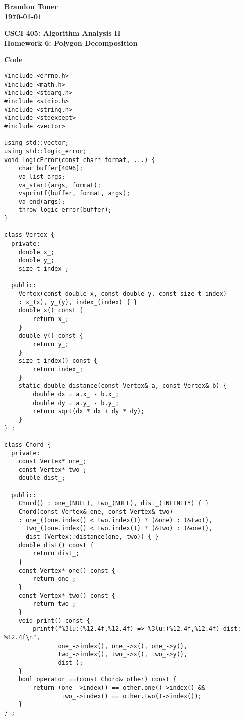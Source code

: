 \documentclass{article}%
\begin{document}
\begin{flushright}
\textbf{Brandon Toner \\
\today}
\end{flushright}

\begin{center}
\textbf{CSCI 405: Algorithm Analysis II \\
Homework 6: Polygon Decomposition} \\
\end{center}

\textbf{Code}
\begin{verbatim}
#include <errno.h>
#include <math.h>
#include <stdarg.h>
#include <stdio.h>
#include <string.h>
#include <stdexcept>
#include <vector>

using std::vector;
using std::logic_error;
void LogicError(const char* format, ...) {
    char buffer[4096];
    va_list args;
    va_start(args, format);
    vsprintf(buffer, format, args);
    va_end(args);
    throw logic_error(buffer);
}

class Vertex {
  private:
    double x_;
    double y_;
    size_t index_;

  public:
    Vertex(const double x, const double y, const size_t index)
    : x_(x), y_(y), index_(index) { }
    double x() const {
        return x_;
    }
    double y() const {
        return y_;
    }
    size_t index() const {
        return index_;
    }
    static double distance(const Vertex& a, const Vertex& b) {
        double dx = a.x_ - b.x_;
        double dy = a.y_ - b.y_;
        return sqrt(dx * dx + dy * dy);
    }
} ;

class Chord {
  private:
    const Vertex* one_;
    const Vertex* two_;
    double dist_;

  public:
    Chord() : one_(NULL), two_(NULL), dist_(INFINITY) { }
    Chord(const Vertex& one, const Vertex& two)
    : one_((one.index() < two.index()) ? (&one) : (&two)),
      two_((one.index() < two.index()) ? (&two) : (&one)),
      dist_(Vertex::distance(one, two)) { }
    double dist() const {
        return dist_;
    }
    const Vertex* one() const {
        return one_;
    }
    const Vertex* two() const {
        return two_;
    }
    void print() const {
        printf("%3lu:(%12.4f,%12.4f) => %3lu:(%12.4f,%12.4f) dist: %12.4f\n",
               one_->index(), one_->x(), one_->y(),
               two_->index(), two_->x(), two_->y(),
               dist_);
    }
    bool operator ==(const Chord& other) const {
        return (one_->index() == other.one()->index() &&
                two_->index() == other.two()->index());
    }
} ;


\end{verbatim}
\end{document}
